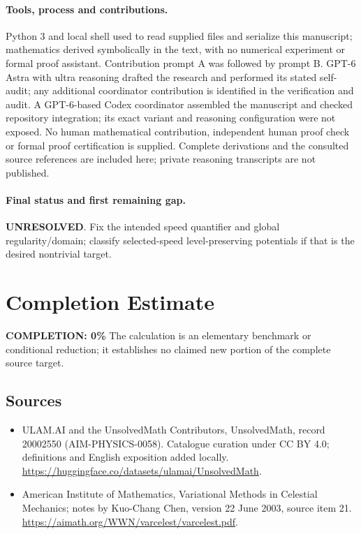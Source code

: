 \documentclass[11pt]{article}
\begin{document}
\paragraph{Tools, process and contributions.}
Python 3 and local shell used to read supplied files and serialize this manuscript; mathematics derived symbolically in the text, with no numerical experiment or formal proof assistant. Contribution prompt A was followed by prompt B. GPT-6 Astra with ultra reasoning drafted the research and performed its stated self-audit; any additional coordinator contribution is identified in the verification and audit. A GPT-6-based Codex coordinator assembled the manuscript and checked repository integration; its exact variant and reasoning configuration were not exposed. No human mathematical contribution, independent human proof check or formal proof certification is supplied. Complete derivations and the consulted source references are included here; private reasoning transcripts are not published.

\paragraph{Final status and first remaining gap.}
\textbf{UNRESOLVED}. Fix the intended speed quantifier and global regularity/domain; classify selected-speed level-preserving potentials if that is the desired nontrivial target.

\section{Completion Estimate}
\noindent\textbf{COMPLETION: 0\%}
The calculation is an elementary benchmark or conditional reduction; it establishes no claimed new portion of the complete source target.

\subsection{Sources}
\begin{itemize}
\item[\hypertarget{source:20002550:1}{S1}] ULAM.AI and the UnsolvedMath Contributors, UnsolvedMath, record 20002550 (AIM-PHYSICS-0058). Catalogue curation under CC BY 4.0; definitions and English exposition added locally.
\url{https://huggingface.co/datasets/ulamai/UnsolvedMath}.
\item[\hypertarget{source:20002550:2}{S2}] American Institute of Mathematics, Variational Methods in Celestial Mechanics; notes by Kuo-Chang Chen, version 22 June 2003, source item 21.
\url{https://aimath.org/WWN/varcelest/varcelest.pdf}.
\end{itemize}
\label{end:20002550}
\end{document}
